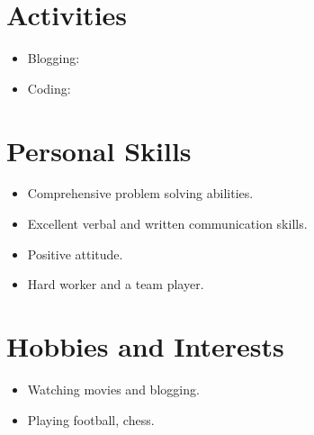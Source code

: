 \documentclass[11pt,a4paper]{moderncv}
\begin{document}
\section{Activities}
	\begin{itemize}
		\item{ Blogging: \textcolor{gray}{}}
		\item{ Coding: \textcolor{gray}{}}
	\end{itemize}
	
	



\section{Personal Skills}
	\begin{itemize}
		\item{ Comprehensive problem solving abilities.}
		\item{ Excellent verbal and written communication skills.}
		\item{ Positive attitude.}
		\item{ Hard worker and a team player.}

	\end{itemize}
	


\section{Hobbies and Interests}
	\begin{itemize}
		\item{ Watching movies and blogging.}
		\item{ Playing football, chess.}
		\end{itemize}
			
\end{document}
